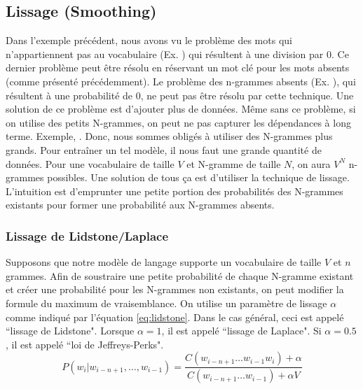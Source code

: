 \documentclass{KodeBook}
\begin{document}
\subsection{Lissage (Smoothing)}

Dans l'exemple précédent, nous avons vu le problème des mots qui n'appartiennent pas au vocabulaire (Ex. ) qui résultent à une division par $0$. 
Ce dernier problème peut être résolu en réservant un mot clé pour les mots absents (comme présenté précédemment).
Le problème des n-grammes absents (Ex. ), qui résultent à une probabilité de $0$, ne peut pas être résolu par cette technique. 
Une solution de ce problème est d'ajouter plus de données.
Même sans ce problème, si on utilise des petits N-grammes, on peut ne pas capturer les dépendances à long terme. 
Exemple, . 
Donc, nous sommes obligés à utiliser des N-grammes plus grands. 
Pour entraîner un tel modèle, il nous faut une grande quantité de données. 
Pour une vocabulaire de taille $V$ et N-gramme de taille $N$, on aura $V^N$ n-grammes possibles.
Une solution de tous ça est d'utiliser la technique de lissage.
L'intuition est d'emprunter une petite portion des probabilités des N-grammes existants pour former une probabilité aux N-grammes absents.

\subsubsection{Lissage de Lidstone/Laplace}

Supposons que notre modèle de langage supporte un vocabulaire de taille $V$ et $n$ grammes.
Afin de soustraire une petite probabilité de chaque N-gramme existant et créer une probabilité pour les N-grammes non existants, on peut modifier la formule du maximum de vraisemblance.
On utilise un paramètre de lissage $\alpha$ comme indiqué par l'équation \ref{eq:lidstone}.
Dans le cas général, ceci est appelé ``lissage de Lidstone". 
Lorsque $\alpha = 1$, il est appelé ``lissage de Laplace". 
Si $\alpha = 0.5$, il est appelé ``loi de Jeffreys-Perks".
\begin{equation}
	P(w_i | w_{i-n+1}, \ldots, w_{i-1}) = \frac{C(w_{i-n+1} \ldots w_{i-1} w_i) + \alpha}{C(w_{i-n+1} \ldots w_{i-1}) + \alpha V}
	\label{eq:lidstone}
\end{equation}
\end{document}
